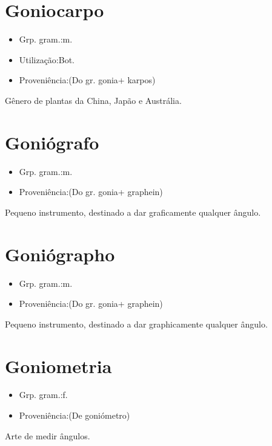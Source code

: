 \section{Goniocarpo}
\begin{itemize}
\item {Grp. gram.:m.}
\end{itemize}
\begin{itemize}
\item {Utilização:Bot.}
\end{itemize}
\begin{itemize}
\item {Proveniência:(Do gr. \textunderscore gonia\textunderscore  + \textunderscore karpos\textunderscore )}
\end{itemize}
Gênero de plantas da China, Japão e Austrália.
\section{Goniógrafo}
\begin{itemize}
\item {Grp. gram.:m.}
\end{itemize}
\begin{itemize}
\item {Proveniência:(Do gr. \textunderscore gonia\textunderscore  + \textunderscore graphein\textunderscore )}
\end{itemize}
Pequeno instrumento, destinado a dar graficamente qualquer ângulo.
\section{Goniógrapho}
\begin{itemize}
\item {Grp. gram.:m.}
\end{itemize}
\begin{itemize}
\item {Proveniência:(Do gr. \textunderscore gonia\textunderscore  + \textunderscore graphein\textunderscore )}
\end{itemize}
Pequeno instrumento, destinado a dar graphicamente qualquer ângulo.
\section{Goniometria}
\begin{itemize}
\item {Grp. gram.:f.}
\end{itemize}
\begin{itemize}
\item {Proveniência:(De \textunderscore goniómetro\textunderscore )}
\end{itemize}
Arte de medir ângulos.

